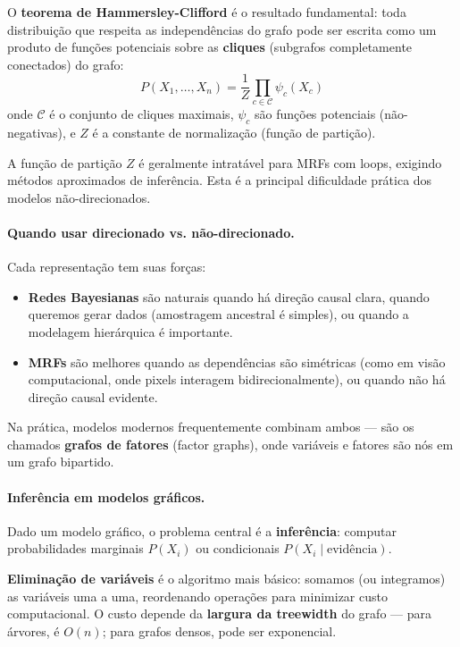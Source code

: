 \documentclass{tufte-handout}
\begin{document}
O \textbf{teorema de Hammersley-Clifford} é o resultado fundamental: toda distribuição que respeita as independências do grafo pode ser escrita como um produto de funções potenciais sobre as \textbf{cliques} (subgrafos completamente conectados) do grafo:
\[
P(X_1, \dots, X_n) = \frac{1}{Z} \prod_{c \in \mathcal{C}} \psi_c(X_c)
\]
onde $\mathcal{C}$ é o conjunto de cliques maximais, $\psi_c$ são funções potenciais (não-negativas), e $Z$ é a constante de normalização (função de partição).

\begin{remark}
    A função de partição $Z$ é geralmente intratável para MRFs com loops, exigindo métodos aproximados de inferência. Esta é a principal dificuldade prática dos modelos não-direcionados.
\end{remark}

\paragraph{Quando usar direcionado vs. não-direcionado.}

Cada representação tem suas forças:

\begin{itemize}
    \item \textbf{Redes Bayesianas} são naturais quando há direção causal clara, quando queremos gerar dados (amostragem ancestral é simples), ou quando a modelagem hierárquica é importante.
    \item \textbf{MRFs} são melhores quando as dependências são simétricas (como em visão computacional, onde pixels interagem bidirecionalmente), ou quando não há direção causal evidente.
\end{itemize}

Na prática, modelos modernos frequentemente combinam ambos --- são os chamados \textbf{grafos de fatores} (factor graphs), onde variáveis e fatores são nós em um grafo bipartido.

\paragraph{Inferência em modelos gráficos.}

Dado um modelo gráfico, o problema central é a \textbf{inferência}: computar probabilidades marginais $P(X_i)$ ou condicionais $P(X_i \mid \text{evidência})$.

\textbf{Eliminação de variáveis} é o algoritmo mais básico: somamos (ou integramos) as variáveis uma a uma, reordenando operações para minimizar custo computacional. O custo depende da \textbf{largura da treewidth} do grafo --- para árvores, é $O(n)$; para grafos densos, pode ser exponencial.
\end{document}
